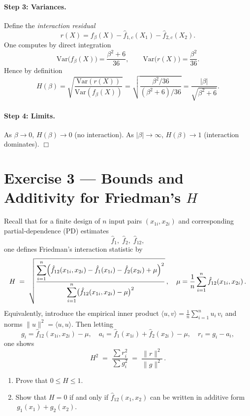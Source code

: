 \documentclass[a4paper]{article}
\begin{document}
\paragraph{Step 3: Variances.}
Define the \emph{interaction residual}
\[
r(X)
= f_\beta(X)-\hat f_{1,c}(X_1)-\hat f_{2,c}(X_2).
\]
One computes by direct integration
\[
\text{Var}\bigl(f_\beta(X)\bigr)
= \frac{\beta^2 + 6}{36},
\qquad
\text{Var}\bigl(r(X)\bigr)
= \frac{\beta^2}{36}.
\]
Hence by definition
\[
H(\beta)
= \sqrt{\frac{\text{Var}(r(X))}{\text{Var}(f_\beta(X))}}
= \sqrt{\frac{\beta^2/36}{(\beta^2+6)/36}}
= \frac{|\beta|}{\sqrt{\beta^2+6}}.
\]

\paragraph{Step 4: Limits.}
As $\beta\to0$, $H(\beta)\to0$ (no interaction).  As $|\beta|\to\infty$, $H(\beta)\to1$ (interaction dominates). $\Box$

\section*{Exercise 3 — Bounds and Additivity for Friedman's $H$}
\label{ex:H_bounds_improved}

Recall that for a finite design of $n$ input pairs $(x_{1i},x_{2i})$ 
and corresponding partial‐dependence (PD) estimates 
\[
\hat f_{1},\;\hat f_{2},\;\hat f_{12},
\]
one defines Friedman's interaction statistic by
\[
H \;=\;
\sqrt{\frac{\displaystyle
    \sum_{i=1}^n
      \Bigl(
        \hat f_{12}(x_{1i},x_{2i})
        -\hat f_{1}(x_{1i})
        -\hat f_{2}(x_{2i})
        +\mu
      \Bigr)^{2}
  }{\displaystyle
    \sum_{i=1}^n
      \bigl(
        \hat f_{12}(x_{1i},x_{2i})-\mu
      \bigr)^{2}
  }} \,,
\quad
\mu = \frac{1}{n}\sum_{i=1}^n \hat f_{12}(x_{1i},x_{2i})\,.
\]
Equivalently, introduce the empirical inner product
\(\displaystyle\langle u,v\rangle = \frac1n\sum_{i=1}^n u_i\,v_i\) and norms
\(\|u\|^2=\langle u,u\rangle\).  Then letting
\[
g_i = \hat f_{12}(x_{1i},x_{2i}) - \mu,
\quad
a_i = \hat f_{1}(x_{1i}) + \hat f_{2}(x_{2i}) - \mu,
\quad
r_i = g_i - a_i,
\]
one shows
\[
H^2 \;=\; \frac{\sum r_i^2}{\sum g_i^2}
\;=\;\frac{\|r\|^2}{\|g\|^2}\,.
\]

\begin{enumerate}%
  \item Prove that \(0\le H\le1\).
  \item Show that \(H=0\) if and only if
        \(\hat f_{12}(x_1,x_2)\) can be written in additive form
        \(\,g_1(x_1)+g_2(x_2)\).
\end{enumerate}
\end{document}
